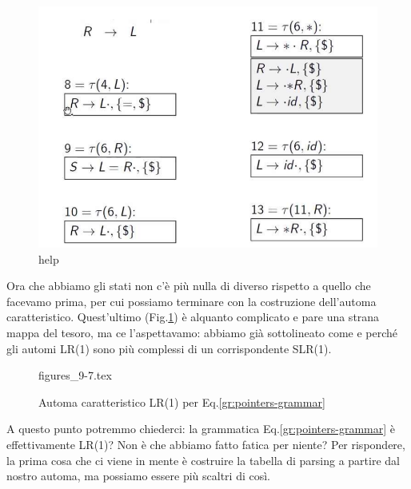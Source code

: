 \documentclass[class=book, crop=false, oneside, 12pt]{standalone}
\begin{document}
\begin{figure}[H]
    \centering
    \includegraphics[width=.8\textwidth]{send_help_2.png}
    \caption{help}
\end{figure}
Ora che abbiamo gli stati non c'è più nulla di diverso rispetto a quello che facevamo prima, per cui possiamo terminare con la costruzione dell'automa caratteristico. Quest'ultimo (Fig.\ref{fig:pointers-automaton}) è alquanto complicato e pare una strana mappa del tesoro, ma ce l'aspettavamo: abbiamo già sottolineato come e perché gli automi LR(1) sono più complessi di un corrispondente SLR(1).
\begin{figure}[H]
    \centering
	{figures_9-7.tex}
    \caption{Automa caratteristico LR(1) per Eq.\ref{gr:pointers-grammar}}
    \label{fig:pointers-automaton}
\end{figure}
A questo punto potremmo chiederci: la grammatica Eq.\ref{gr:pointers-grammar} è effettivamente LR(1)? Non è che abbiamo fatto fatica per niente? Per rispondere, la prima cosa che ci viene in mente è costruire la tabella di parsing a partire dal nostro automa, ma possiamo essere più scaltri di così.
\end{document}
